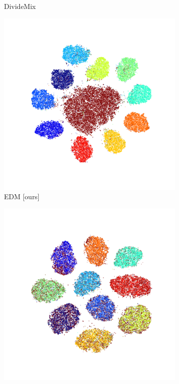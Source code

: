 \documentclass[12pt]{article}
\begin{document}
\begin{figure}[t]
\begin{subfigure}{.18\textwidth}
      \caption*{DivideMix~}
    \end{subfigure}
    \begin{subfigure}{.18\textwidth}
      \centering
      \includegraphics[width=\linewidth]{images/tsne/tsne_EDM_imagenet32_D.png}
      \caption*{EDM [ours]}
    \end{subfigure}
    \begin{subfigure}{.18\textwidth}
      \centering
      \includegraphics[width=\linewidth]{images/tsne/tsne_DM_cifar100.png}

\end{subfigure}
\end{figure}
\end{document}
